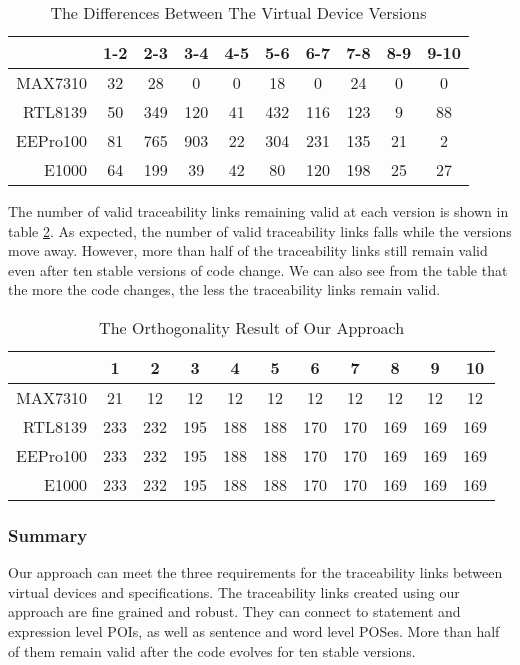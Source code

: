 \begin{table}[th]
\caption{The Differences Between The Virtual Device Versions}
\centering
\begin{tabular*}{0.9\textwidth}{@{\extracolsep{\fill}}rccccccccc}
\hline
 & 1-2 & 2-3 & 3-4 & 4-5 & 5-6 & 6-7 & 7-8 & 8-9 & 9-10 \\
\hline
MAX7310 & 32 & 28 & 0 & 0 & 18 & 0 & 24 & 0 & 0\\
RTL8139 & 50 & 349 & 120 & 41 & 432 & 116 & 123 & 9 & 88\\
EEPro100 & 81 & 765 & 903 & 22 & 304 & 231 & 135 & 21 & 2\\
E1000 & 64 & 199 & 39 & 42 & 80 & 120 & 198 & 25 & 27\\
\hline
\end{tabular*}
\label{table:version}
\end{table}

The number of valid traceability links remaining valid at each version is shown in table \ref{table:robust}. As expected, the number of valid traceability links falls while the versions move away. However, more than half of the traceability links still remain valid even after ten stable versions of code change. We can also see from the table that the more the code changes, the less the traceability links remain valid.

\begin{table}[th]
\caption{The Orthogonality Result of Our Approach}
\centering
\begin{tabular*}{0.9\textwidth}{@{\extracolsep{\fill}}rcccccccccc}
\hline
 & 1 & 2 & 3 & 4 & 5 & 6 & 7 & 8 & 9 & 10 \\
\hline
MAX7310 & 21 & 12 & 12 & 12 & 12 & 12 & 12 & 12 & 12 & 12\\
RTL8139  & 233 & 232 & 195 & 188 & 188 & 170 & 170 & 169 & 169 & 169\\
EEPro100  & 233 & 232 & 195 & 188 & 188 & 170 & 170 & 169 & 169 & 169\\
E1000  & 233 & 232 & 195 & 188 & 188 & 170 & 170 & 169 & 169 & 169\\
\hline
\end{tabular*}
\label{table:robust}
\end{table}

\subsubsection{Summary}
Our approach can meet the three requirements for the traceability links between virtual devices and specifications.
The traceability links created using our approach are fine grained and robust. They can connect to statement and expression level POIs, as well as sentence and word level POSes. More than half of them remain valid after the code evolves for ten stable versions.

